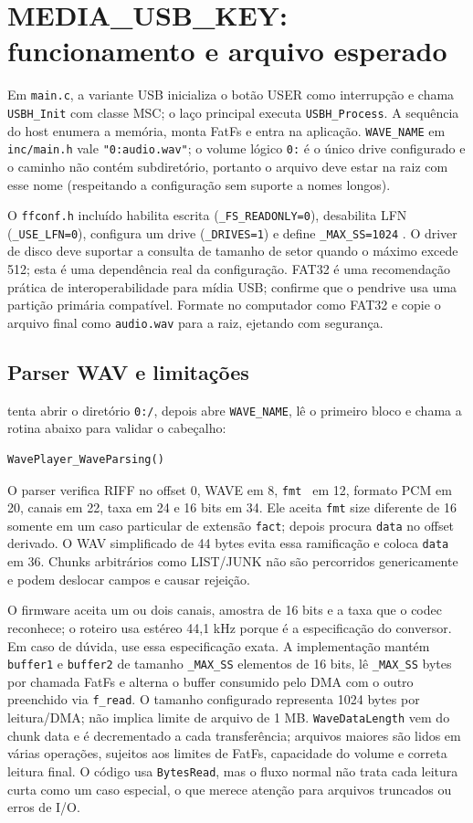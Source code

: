 \documentclass[12pt,journal,compsoc]{IEEEtran}
\newcommand{\funcao}[1]{\path{#1}}
\begin{document}
\section{MEDIA\_USB\_KEY: funcionamento e arquivo esperado}
Em \texttt{main.c}, a variante USB inicializa o botão USER como interrupção e chama \texttt{USBH\_Init} com classe MSC; o laço principal executa \texttt{USBH\_Process}. A sequência do host enumera a memória, monta FatFs e entra na aplicação. \texttt{WAVE\_NAME} em \texttt{inc/main.h} vale \texttt{"0:audio.wav"}; o volume lógico \texttt{0:} é o único drive configurado e o caminho não contém subdiretório, portanto o arquivo deve estar na raiz com esse nome (respeitando a configuração sem suporte a nomes longos).

O \texttt{ffconf.h} incluído habilita escrita (\texttt{\_FS\_READONLY=0}), desabilita LFN (\texttt{\_USE\_LFN=0}), configura um drive (\texttt{\_DRIVES=1}) e define \texttt{\_MAX\_SS=1024} \cite{fatfs}. O driver de disco deve suportar a consulta de tamanho de setor quando o máximo excede 512; esta é uma dependência real da configuração. FAT32 é uma recomendação prática de interoperabilidade para mídia USB; confirme que o pendrive usa uma partição primária compatível. Formate no computador como FAT32 e copie o arquivo final como \texttt{audio.wav} para a raiz, ejetando com segurança.

\subsection{Parser WAV e limitações}
\funcao{WavePlayerStart()} tenta abrir o diretório \texttt{0:/}, depois abre \texttt{WAVE\_NAME}, lê o primeiro bloco e chama a rotina abaixo para validar o cabeçalho:
\begin{lstlisting}
WavePlayer_WaveParsing()
\end{lstlisting}
O parser verifica RIFF no offset 0, WAVE em 8, \texttt{fmt } em 12, formato PCM em 20, canais em 22, taxa em 24 e 16 bits em 34. Ele aceita \texttt{fmt} size diferente de 16 somente em um caso particular de extensão \texttt{fact}; depois procura \texttt{data} no offset derivado. O WAV simplificado de 44 bytes evita essa ramificação e coloca \texttt{data} em 36. Chunks arbitrários como LIST/JUNK não são percorridos genericamente e podem deslocar campos e causar rejeição.

O firmware aceita um ou dois canais, amostra de 16 bits e a taxa que o codec reconhece; o roteiro usa estéreo 44,1 kHz porque é a especificação do conversor. Em caso de dúvida, use essa especificação exata. A implementação mantém \texttt{buffer1} e \texttt{buffer2} de tamanho \texttt{\_MAX\_SS} elementos de 16 bits, lê \texttt{\_MAX\_SS} bytes por chamada FatFs e alterna o buffer consumido pelo DMA com o outro preenchido via \texttt{f\_read}. O tamanho configurado representa 1024 bytes por leitura/DMA; não implica limite de arquivo de 1 MB. \texttt{WaveDataLength} vem do chunk data e é decrementado a cada transferência; arquivos maiores são lidos em várias operações, sujeitos aos limites de FatFs, capacidade do volume e correta leitura final. O código usa \texttt{BytesRead}, mas o fluxo normal não trata cada leitura curta como um caso especial, o que merece atenção para arquivos truncados ou erros de I/O.
\end{document}
